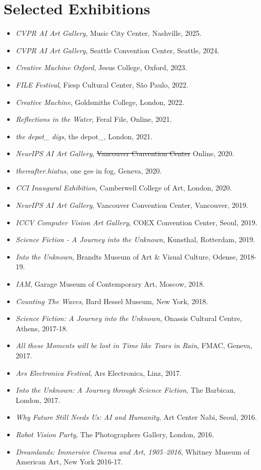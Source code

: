 \documentclass[letterpaper,11pt]{article}
\newcommand{\resumeItem}[2]{
  \item\small{
    \textbf{#1}{ #2 \vspace{-2pt}}
  }
}
\newcommand{\resumeSubItem}[2]{\resumeItem{#1}{#2}\vspace{-4pt}}
\newcommand{\resumeSubHeadingListStart}{\begin{itemize}[leftmargin=*]}
\newcommand{\resumeSubHeadingListEnd}{\end{itemize}}
\begin{document}
\section{Selected Exhibitions}
 \resumeSubHeadingListStart
  \resumeSubItem{}{\textit{CVPR AI Art Gallery}, Music City Center, Nashville, 2025.}
  \resumeSubItem{}{\textit{CVPR AI Art Gallery}, Seattle Convention Center, Seattle, 2024.}
  \resumeSubItem{}{\textit{Creative Machine Oxford}, Jesus College, Oxford, 2023.}
  \resumeSubItem{}{\textit{FILE Festival}, Fiesp Cultural Center, São Paulo, 2022.}
  \resumeSubItem{}{\textit{Creative Machine}, Goldsmiths College, London, 2022.}
  \resumeSubItem{}{\textit{Reflections in the Water}, Feral File, Online, 2021.}
  \resumeSubItem{}{\textit{the depot\_ digs}, the depot\_, London, 2021.}
  \resumeSubItem{}{\textit{NeurIPS AI Art Gallery}, \sout{Vancouver Convention Center} Online, 2020.}
  \resumeSubItem{}{\textit{thereafter.hiatus}, one gee in fog, Geneva, 2020. }
  \resumeSubItem{}{\textit{CCI Inaugural Exhibition}, Camberwell College of Art, London, 2020. }
  \resumeSubItem{}{\textit{NeurIPS AI Art Gallery}, Vancouver Convention Center, Vancouver, 2019.}
  \resumeSubItem{}{\textit{ICCV Computer Vision Art Gallery}, COEX Convention Center, Seoul, 2019. }
  \resumeSubItem{}{\textit{Science Fiction - A Journey into the Unknown}, Kunsthal, Rotterdam, 2019.}
  \resumeSubItem{}{\textit{Into the Unknown}, Brandts Museum of Art \& Visual Culture, Odense, 2018-19.}
  \resumeSubItem{}{\textit{IAM}, Garage Museum of Contemporary Art, Moscow, 2018.}
  \resumeSubItem{}{\textit{Counting The Waves}, Bard Hessel Museum, New York, 2018. }
  \resumeSubItem{}{\textit{Science Fiction: A Journey into the Unknown}, Onassis Cultural Centre, Athens, 2017-18.}
  \resumeSubItem{}{\textit{All these Moments will be lost in Time like Tears in Rain}, FMAC, Geneva, 2017. }
  \resumeSubItem{}{\textit{Ars Electronica Festival}, Ars Electronica, Linz, 2017. }
  \resumeSubItem{}{\textit{Into the Unknown: A Journey through Science Fiction}, The Barbican, London, 2017.}
  \resumeSubItem{}{\textit{Why Future Still Needs Us: AI and Humanity}, Art Center Nabi, Seoul, 2016.}
  \resumeSubItem{}{\textit{Robot Vision Party}, The Photographers Gallery, London, 2016.}
  \resumeSubItem{}{\textit{Dreamlands: Immersive Cinema and Art, 1905–2016}, Whitney Museum of American Art, New York 2016-17.}
 \resumeSubHeadingListEnd

\end{document}

